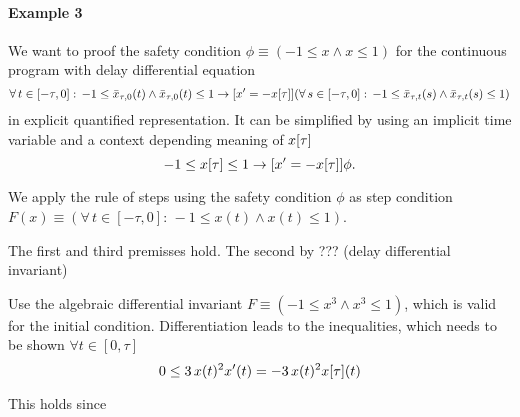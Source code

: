 \documentclass[10pt]{report}
\begin{document}
            \paragraph{Example 3}
                \label{sec:ddi-example-3}

                We want to proof the safety condition $\phi\equiv(-1\leq x\wedge x\leq 1)$ for the continuous program with delay differential equation
                \begin{equation}
                    \forall\,t\in[-\tau,0]:\,-1\leq\xbartaut{0}(t)\wedge\xbartaut{0}(t)\leq 1
                    \rightarrow
                    [x'=-\xtau] (\forall\,s\in[-\tau,0]:\,-1\leq\xbartaut{t}(s)\wedge\xbartaut{t}(s)\leq 1)
                \end{equation}
                in explicit quantified representation. It can be simplified by using an implicit time variable and a context depending meaning of $\xtau$
                \begin{equation}
                    -1\leq\xtau\leq 1 \rightarrow [x'=-\xtau]\phi.
                \end{equation}

                We apply the rule of steps using the safety condition $\phi$ as step condition $F(x)\equiv(\forall\,t\in[-\tau,0]:\,-1\leq x(t)\wedge x(t)\leq 1)$.

                The first and third premisses hold. The second by ??? (delay differential invariant)

                Use the algebraic differential invariant $F\equiv(-1\leq x^3\wedge x^3\leq1)$, which is valid for the initial condition. Differentiation leads to the inequalities, which needs to be shown $\forall t\in[0,\tau]$
                \begin{equation}
                    0\leq 3\,x(t)^2 x'(t) = -3\,x(t)^2 \xtau(t)
                \end{equation}

                This holds since



\nocite{*}


\end{document}
